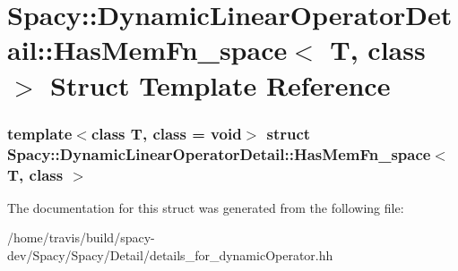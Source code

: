 \hypertarget{structSpacy_1_1DynamicLinearOperatorDetail_1_1HasMemFn__space}{\section{\-Spacy\-:\-:\-Dynamic\-Linear\-Operator\-Detail\-:\-:\-Has\-Mem\-Fn\-\_\-space$<$ \-T, class $>$ \-Struct \-Template \-Reference}
\label{structSpacy_1_1DynamicLinearOperatorDetail_1_1HasMemFn__space}
}
\subsubsection*{template$<$class T, class = void$>$ struct Spacy\-::\-Dynamic\-Linear\-Operator\-Detail\-::\-Has\-Mem\-Fn\-\_\-space$<$ T, class $>$}



\-The documentation for this struct was generated from the following file\-:\begin{DoxyCompactItemize}
\item 
/home/travis/build/spacy-\/dev/\-Spacy/\-Spacy/\-Detail/details\-\_\-for\-\_\-dynamic\-Operator.\-hh\end{DoxyCompactItemize}
